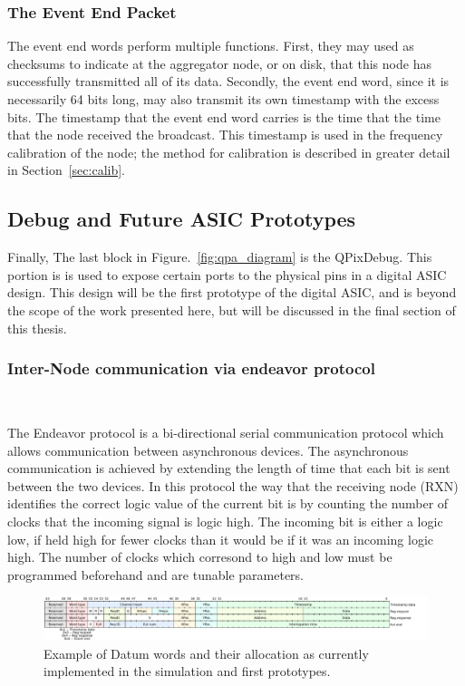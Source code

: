 \subsubsection{The Event End Packet}

The event end words perform multiple functions.
First, they may used as checksums to indicate at the aggregator node, or on disk, that this node has successfully transmitted all of its data.
Secondly, the event end word, since it is necessarily 64 bits long, may also transmit its own timestamp with the excess bits.
The timestamp that the event end word carries is the time that the time that the node received the broadcast.
This timestamp is used in the frequency calibration of the node; the method for calibration is described in greater detail in Section~\ref{sec:calib}.

\subsection{Debug and Future ASIC Prototypes}

Finally, The last block in Figure.~\ref{fig:qpa_diagram} is the QPixDebug.
This portion is is used to expose certain ports to the physical pins in a digital ASIC design.
This design will be the first prototype of the digital ASIC, and is beyond the scope of the work presented here, but will be discussed in the final section of this thesis.

\subsubsection{Inter-Node communication via endeavor protocol}
~\label{sect:endeavor}

The Endeavor protocol is a bi-directional serial communication protocol which allows communication between asynchronous devices.
The asynchronous communication is achieved by extending the length of time that each bit is sent between the two devices.
In this protocol the way that the receiving node (RXN) identifies the correct logic value of the current bit is by counting the number of clocks that the incoming signal is logic high.
The incoming bit is either a logic low, if held high for fewer clocks than it would be if it was an incoming logic high.
The number of clocks which corresond to high and low must be programmed beforehand and are tunable parameters.

\begin{figure}[]
\centering
\includegraphics[width=\textwidth]{images/qpix_word_format.pdf}
\caption{Example of Datum words and their allocation as currently implemented in the simulation and first prototypes.}
\end{figure}~\label{fig:datum}

